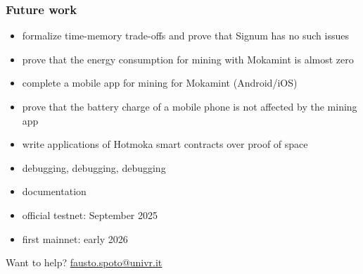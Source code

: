 \documentclass[11pt]{beamer}  %
\begin{document}
\begin{frame}\frametitle{Future work}

  \begin{itemize}
  \item formalize time-memory trade-offs and prove that Signum has no such issues
  \item prove that the energy consumption for mining with Mokamint is almost zero
  \item complete a mobile app for mining for Mokamint (Android/iOS)
  \item prove that the battery charge of a mobile phone is not affected by the mining app
  \item write applications of Hotmoka smart contracts over proof of space
  \item debugging, debugging, debugging
  \item documentation
  \item official testnet: September 2025
  \item first mainnet: early 2026
  \end{itemize}

  \begin{center}
    \alert{Want to help? \url{fausto.spoto@univr.it}}
  \end{center}

\end{frame}
\end{document}
